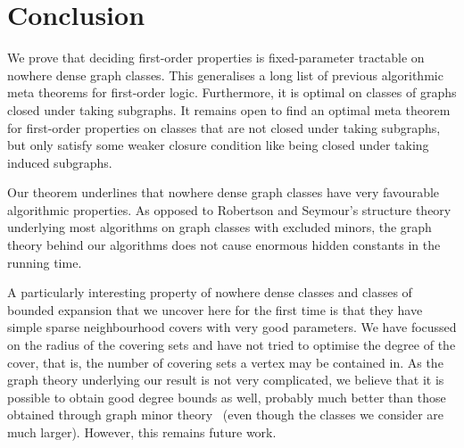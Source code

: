 \documentclass[11pt]{article}
\numberwithin{equation}{section}
\begin{document}
\section{Conclusion}
\label{sec:conclusion}
We prove that deciding first-order properties 
is fixed-parameter tractable on nowhere dense graph classes. This
generalises a long list of previous algorithmic meta theorems for
first-order logic. Furthermore, it is optimal on classes of graphs
closed under taking subgraphs. 
It remains open to find an optimal meta theorem for first-order
properties on classes that are not closed under taking subgraphs, but
only satisfy some weaker closure condition like being closed under
taking induced subgraphs. 

Our theorem underlines that nowhere dense graph classes have very favourable
algorithmic properties. As opposed to 
Robertson and Seymour's structure theory underlying most algorithms on
graph classes with excluded minors, the graph theory behind our
algorithms does not cause enormous
hidden constants in the running time. 

A particularly interesting property of nowhere dense classes and
classes of bounded expansion that we
uncover here for the first time is that they have simple sparse neighbourhood
covers with very good parameters. We have focussed on the radius of the
covering sets and have not tried to optimise the degree of the cover, that
is, the number of covering sets a vertex may be contained in. As
the graph theory underlying our result is not very complicated, we
believe that it is possible to obtain good degree bounds as well, probably
much better than those obtained through graph minor theory~\cite{abrgavmal+07,buscoslaf+07} (even
though the classes we consider are much larger). However, this remains
future work.


%

%
%
\end{document}
